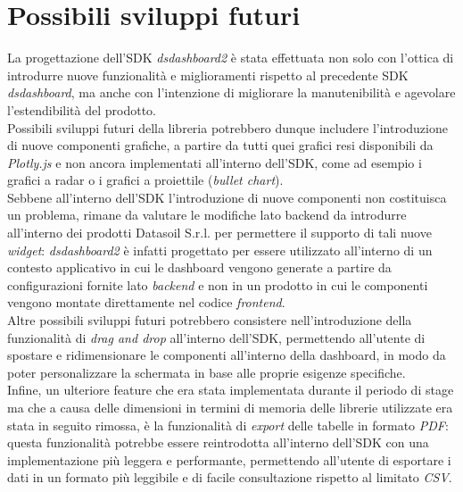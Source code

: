 \section{Possibili sviluppi futuri}
La progettazione dell'SDK \textit{dsdashboard2} è stata effettuata non solo con l'ottica di introdurre nuove funzionalità e miglioramenti rispetto al precedente
SDK \textit{dsdashboard}, ma anche con l'intenzione di migliorare la manutenibilità e agevolare l'estendibilità del prodotto. \\
Possibili sviluppi futuri della libreria potrebbero dunque includere l'introduzione di nuove componenti grafiche, a partire da tutti quei grafici resi disponibili
da \textit{Plotly.js} e non ancora implementati all'interno dell'SDK, come ad esempio i grafici a radar o i grafici a proiettile (\textit{bullet chart}). \\
Sebbene all'interno dell'SDK l'introduzione di nuove componenti non costituisca un problema, rimane da valutare le modifiche lato backend da introdurre all'interno
dei prodotti Datasoil S.r.l. per permettere il supporto di tali nuove \textit{widget}: \textit{dsdashboard2} è infatti progettato per essere utilizzato all'interno
di un contesto applicativo in cui le dashboard vengono generate a partire da configurazioni fornite lato \textit{backend} e non in un prodotto in cui le componenti
vengono montate direttamente nel codice \textit{frontend}. \\
Altre possibili sviluppi futuri potrebbero consistere nell'introduzione della funzionalità di \textit{drag and drop} all'interno dell'SDK, permettendo all'utente
di spostare e ridimensionare le componenti all'interno della dashboard, in modo da poter personalizzare la schermata in base alle proprie esigenze specifiche. \\
Infine, un ulteriore feature che era stata implementata durante il periodo di stage ma che a causa delle dimensioni in termini di memoria delle librerie utilizzate
era stata in seguito rimossa, è la funzionalità di \textit{export} delle tabelle in formato \textit{PDF}: questa funzionalità potrebbe essere reintrodotta all'interno
dell'SDK con una implementazione più leggera e performante, permettendo all'utente di esportare i dati in un formato più leggibile e di facile consultazione rispetto
al limitato \textit{CSV}.

